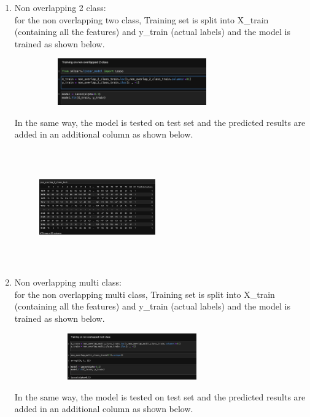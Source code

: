 \documentclass[conference]{IEEEtran}
\begin{document}
\begin{enumerate}
\item
Non overlapping 2 class: \\
for the non overlapping two class, Training set is split into X\_train (containing all the features) and y\_train (actual labels) and the model is trained as shown below.
\begin{figure}[!htbp]
    \centering
    \includegraphics[width=8cm, height=2cm]{task2.1.png}
    \label{fig:my_label}
\end{figure}
In the same way, the model is tested on test set and the predicted results are added in an additional column as shown below.
\begin{figure}[!htbp]
    \centering
    \includegraphics[width=5cm, height=5cm]{task2.2.png}
    \label{fig:my_label}
\end{figure}
\item
Non overlapping multi class: \\
for the non overlapping multi class, Training set is split into X\_train (containing all the features) and y\_train (actual labels) and the model is trained as shown below.
\begin{figure}[!htbp]
    \centering
    \includegraphics[width=8cm, height=2cm]{task2.3.png}
    \label{fig:my_label}
\end{figure}
In the same way, the model is tested on test set and the predicted results are added in an additional column as shown below.
\begin{figure}[!htbp]
    \centering

\end{figure}
\end{enumerate}
\end{document}
